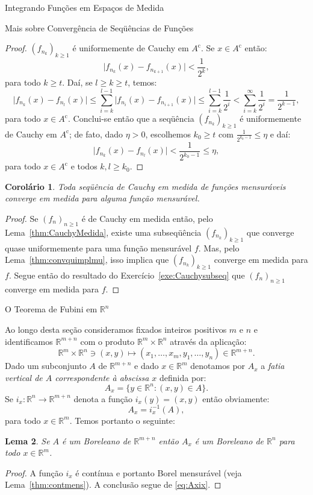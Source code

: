 \documentclass[oneside,final,11pt]{amsbook}
\newcommand{\R}{\mathds R}
\newcommand{\compl}{\mathrm c}
\theoremstyle{remark}\newtheorem{exercise}{Exercício}[chapter]
\theoremstyle{remark}\newtheorem{*exercise}[exercise]{\hbox to 0pt{\hskip 0pt minus 1fil*}Exercício}
\theoremstyle{definition}\newtheorem{exdefin}{Definição}[chapter]
\theoremstyle{plain}\newtheorem{teo}{Teorema}[section]
\theoremstyle{plain}\newtheorem{lem}[teo]{Lema}
\theoremstyle{plain}\newtheorem{prop}[teo]{Proposição}
\theoremstyle{plain}\newtheorem{cor}[teo]{Corolário}
\theoremstyle{definition}\newtheorem{defin}[teo]{Definição}
\theoremstyle{remark}\newtheorem{rem}[teo]{Observação}
\theoremstyle{definition}\newtheorem{notation}[teo]{Notação}
\theoremstyle{definition}\newtheorem{convention}[teo]{Convenção}
\theoremstyle{definition}\newtheorem{example}[teo]{Exemplo}
\numberwithin{section}{chapter}
\numberwithin{equation}{section}
\begin{document}
\begin{chapter}{Integrando Funções em Espaços de Medida}
\begin{section}{Mais sobre Convergência de Seqüências de Funções}
\begin{proof}
$(f_{n_k})_{k\ge1}$ é uniformemente de Cauchy em $A^\compl$. Se $x\in A^\compl$ então:
\[\big\vert f_{n_k}(x)-f_{n_{k+1}}(x)\big\vert<\frac1{2^k},\]
para todo $k\ge t$. Daí, se $l\ge k\ge t$, temos:
\[\big\vert f_{n_k}(x)-f_{n_l}(x)\big\vert\le\sum_{i=k}^{l-1}\big\vert f_{n_i}(x)-f_{n_{i+1}}(x)\big\vert
\le\sum_{i=k}^{l-1}\frac1{2^i}<\sum_{i=k}^\infty\frac1{2^i}=\frac1{2^{k-1}},\]
para todo $x\in A^\compl$. Conclui-se então que a seqüência $(f_{n_k})_{k\ge1}$ é uniformemente de Cauchy em $A^\compl$;
de fato, dado $\eta>0$, escolhemos $k_0\ge t$ com $\frac1{2^{k_0-1}}\le\eta$ e daí:
\[\big\vert f_{n_k}(x)-f_{n_l}(x)\big\vert<\frac1{2^{k_0-1}}\le\eta,\]
para todo $x\in A^\compl$ e todos $k,l\ge k_0$.
\end{proof}

\begin{cor}
Toda seqüência de Cauchy em medida de funções mensuráveis converge em medida para alguma função mensurável.
\end{cor}
\begin{proof}
Se $(f_n)_{n\ge1}$ é de Cauchy em medida então, pelo Lema~\ref{thm:CauchyMedida}, existe uma subseqüência
$(f_{n_k})_{k\ge1}$ que converge quase uniformemente para uma função mensurável $f$. Mas, pelo Lema~\ref{thm:convquimplmu},
isso implica que $(f_{n_k})_{k\ge1}$ converge em medida para $f$. Segue então do resultado do Exercício~\ref{exe:Cauchysubseq}
que $(f_n)_{n\ge1}$ converge em medida para $f$.
\end{proof}

\end{section}

\begin{section}[O Teorema de Fubini em $\R^n$]{O Teorema de Fubini em ${\R^n}$}
\label{sec:Fubini}

Ao longo desta seção consideramos fixados inteiros positivos $m$ e $n$ e identificamos
$\R^{m+n}$ com o produto $\R^m\times\R^n$ através da aplicação:
\begin{equation}\label{eq:identRmRnRmn}
\R^m\times\R^n\ni(x,y)\longmapsto(x_1,\ldots,x_m,y_1,\ldots,y_n)\in\R^{m+n}.
\end{equation}
Dado um subconjunto $A$ de $\R^{m+n}$
e dado $x\in\R^m$ denotamos por $A_x$ a {\em fatia vertical de $A$ correspondente à
abscissa $x$\/} definida por:
\[A_x=\big\{y\in\R^n:(x,y)\in A\big\}.\]
Se $i_x:\R^n\to\R^{m+n}$ denota a função $i_x(y)=(x,y)$ então obviamente:
\begin{equation}\label{eq:Axix}
A_x=i_x^{-1}(A),
\end{equation}
para todo $x\in\R^m$. Temos portanto o seguinte:
\begin{lem}\label{thm:fatiasBorel}
Se $A$ é um Boreleano de $\R^{m+n}$ então $A_x$ é um Boreleano de $\R^n$ para todo $x\in\R^m$.
\end{lem}
\begin{proof}
A função $i_x$ é contínua e portanto Borel mensurável (veja Lema~\ref{thm:contmens}).
A conclusão segue de \eqref{eq:Axix}.
\end{proof}


\end{section}
\end{chapter}
\end{document}
